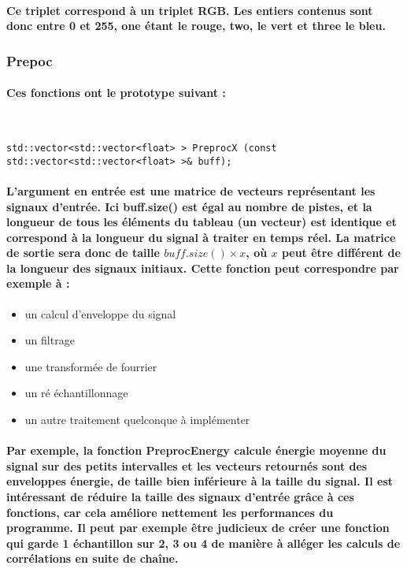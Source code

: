 \documentclass[a4paper]{article}
\begin{document}
\paragraph{Ce triplet correspond à un triplet RGB. Les entiers contenus sont
donc entre 0 et 255, one étant le rouge, two, le vert et three le bleu.}
\newpage

\subsubsection{Prepoc} \paragraph{Ces fonctions ont le prototype suivant :}
\

\begin{lstlisting}
std::vector<std::vector<float> > PreprocX (const std::vector<std::vector<float> >& buff);
\end{lstlisting}

\paragraph{L’argument en entrée est une matrice de vecteurs représentant les
signaux d’entrée. Ici buff.size() est égal au nombre de pistes, et la longueur
de tous les éléments du tableau (un vecteur) est identique et correspond à la
longueur du signal à traiter en temps réel. La matrice de sortie sera donc de
taille $buff.size() \times x$, où $x$ peut être différent de la longueur des
signaux initiaux. Cette fonction peut correspondre par exemple à :}

\begin{itemize} \item un calcul d’enveloppe du signal \item un filtrage \item
une transformée de fourrier \item un ré échantillonnage \item un autre
traitement quelconque à implémenter \end{itemize}

\paragraph{Par exemple, la fonction PreprocEnergy calcule énergie moyenne du
signal sur des petits intervalles et les vecteurs retournés sont des enveloppes
énergie, de taille bien inférieure à la taille du signal. Il est intéressant de
réduire la taille des signaux d’entrée grâce à ces fonctions, car cela améliore
nettement les performances du programme. Il peut par exemple être judicieux de
créer une fonction qui garde 1 échantillon sur 2, 3 ou 4 de manière à alléger
les calculs de corrélations en suite de chaîne.}
\end{document}
